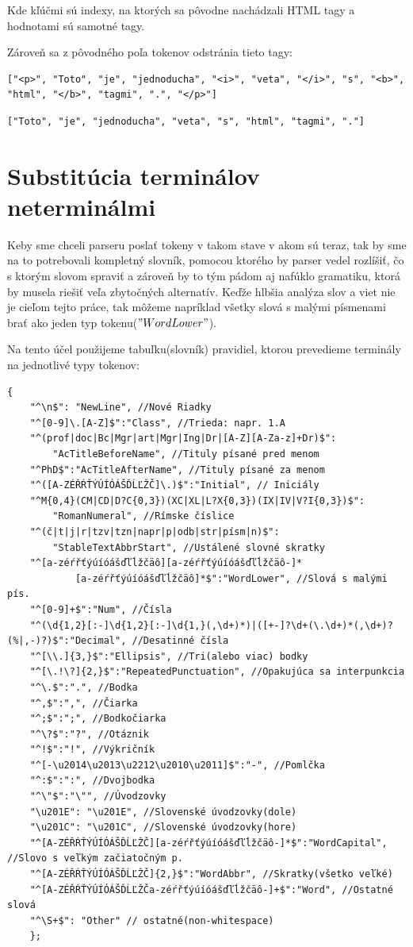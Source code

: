 \documentclass[12pt,a4paper]{report}
\theoremstyle{definition}
\theoremstyle{remark}
\begin{document}
\noindent Kde kľúčmi sú indexy, na ktorých sa pôvodne nachádzali HTML tagy a hodnotami sú samotné tagy.

Zároveň sa z pôvodného poľa tokenov odstránia tieto tagy:
\begin{lstlisting}[caption={Text pred odstránením tagov}, style=htmlcssjs]
["<p>", "Toto", "je", "jednoducha", "<i>", "veta", "</i>", "s", "<b>", "html", "</b>", "tagmi", ".", "</p>"]
\end{lstlisting}
\begin{lstlisting}[caption={Text po odstránení tagov}, style=htmlcssjs]
["Toto", "je", "jednoducha", "veta", "s", "html", "tagmi", "."]
\end{lstlisting}

\section{Substitúcia terminálov neterminálmi}
Keby sme chceli parseru poslať tokeny v takom stave v akom sú teraz, tak by sme na to potrebovali kompletný slovník, pomocou ktorého by parser vedel rozlíšiť, čo s ktorým slovom spraviť a zároveň by to tým pádom aj nafúklo gramatiku, ktorá by musela riešiť veľa zbytočných alternatív. Keďže hlbšia analýza slov a viet nie je cieľom tejto práce, tak  môžeme napríklad všetky slová s malými písmenami brať ako jeden typ tokenu($"WordLower"$).

Na tento účel použijeme tabuľku(slovník) pravidiel, ktorou prevedieme terminály na jednotlivé typy tokenov:\\
\newpage
\begin{lstlisting}[caption={Slovník},label={lst:label},style=htmlcssjs]
	{
	"^\n$": "NewLine", //Nové Riadky
	"^[0-9]\.[A-Z]$":"Class", //Trieda: napr. 1.A
	"^(prof|doc|Bc|Mgr|art|Mgr|Ing|Dr|[A-Z][A-Za-z]+Dr)$":
		"AcTitleBeforeName", //Tituly písané pred menom
	"^PhD$":"AcTitleAfterName", //Tituly písané za menom
	"^([A-ZÉŘŔŤÝÚÍÓÁŠĎĹĽŽČ]\.)$":"Initial", // Iniciály
	"^M{0,4}(CM|CD|D?C{0,3})(XC|XL|L?X{0,3})(IX|IV|V?I{0,3})$":
		"RomanNumeral", //Rímske číslice
	"^(č|t|j|r|tzv|tzn|napr|p|odb|str|písm|n)$":
		"StableTextAbbrStart", //Ustálené slovné skratky
	"^[a-zéŕřťýúíóášďľĺžčäô][a-zéŕřťýúíóášďľĺžčäô-]*
			[a-zéŕřťýúíóášďľĺžčäô]*$":"WordLower", //Slová s malými pís.
	"^[0-9]+$":"Num", //Čísla
	"^(\d{1,2}[:-]\d{1,2}[:-]\d{1,}(,\d+)*)|([+-]?\d+(\.\d+)*(,\d+)?(%|,-)?)$":"Decimal", //Desatinné čísla
	"^[\\.]{3,}$":"Ellipsis", //Tri(alebo viac) bodky
	"^[\.!\?]{2,}$":"RepeatedPunctuation", //Opakujúca sa interpunkcia
	"^\.$":".", //Bodka
	"^,$":",", //Čiarka
	"^;$":";", //Bodkočiarka
	"^\?$":"?", //Otáznik
	"^!$":"!", //Výkričník
	"^[-\u2014\u2013\u2212\u2010\u2011]$":"-", //Pomlčka
	"^:$":":", //Dvojbodka
	"^\"$":"\"", //Úvodzovky
	"\u201E": "\u201E", //Slovenské úvodzovky(dole)
	"\u201C": "\u201C", //Slovenské úvodzovky(hore)
	"^[A-ZÉŘŔŤÝÚÍÓÁŠĎĹĽŽČ][a-zéŕřťýúíóášďľĺžčäô-]*$":"WordCapital", //Slovo s veľkým začiatočným p.
	"^[A-ZÉŘŔŤÝÚÍÓÁŠĎĹĽŽČ]{2,}$":"WordAbbr", //Skratky(všetko veľké)
	"^[A-ZÉŘŔŤÝÚÍÓÁŠĎĹĽŽČa-zéŕřťýúíóášďľĺžčäô-]+$":"Word", //Ostatné slová
	"^\S+$": "Other" // ostatné(non-whitespace)
	};
\end{lstlisting}
\end{document}
